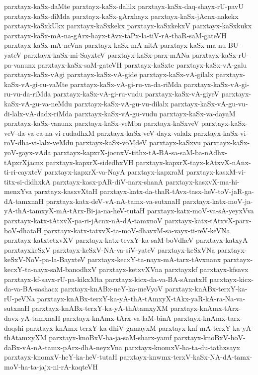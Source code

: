 {parxtayx-kaSx-daMte
parxtayx-kaSx-dalilx
parxtayx-kaSx-daq-shayx-rU-pavU
parxtayx-kaSx-diMda
parxtayx-kaSx-gArxhayx
parxtayx-kaSx-jAcnx-nakekx
parxtayx-kaSxkUkx
parxtayx-kaSxkekx
parxtayx-kaSxkekxV
parxtayx-kaSxkukx
parxtayx-kaSx-mA-na-gArx-hayx-tAvx-taPx-la-tiV-rA-thaR-saM-gateVH
parxtayx-kaSx-mA-neVna
parxtayx-kaSx-mA-nitA
parxtayx-kaSx-ma-nu-BU-yateV
parxtayx-kaSx-mi-SayxteV
parxtayx-kaSx-parx-mANa
parxtayx-kaSx-rU-pa-vanunx
parxtayx-kaSx-saM-gateVH
parxtayx-kaSxte
parxtayx-kaSx-vA-galu
parxtayx-kaSx-vAgi
parxtayx-kaSx-vA-gide
parxtayx-kaSx-vA-gilalx
parxtayx-kaSx-vA-gi-ru-vaMte
parxtayx-kaSx-vA-gi-ru-va-da-riMda
parxtayx-kaSx-vA-gi-ru-vu-da-riMda
parxtayx-kaSx-vA-gi-ru-vudu
parxtayx-kaSx-vA-giyeV
parxtayx-kaSx-vA-gu-va-neMdu
parxtayx-kaSx-vA-gu-vu-dilalx
parxtayx-kaSx-vA-gu-vu-di-lalx-vA-dadx-riMda
parxtayx-kaSx-vA-gu-vudu
parxtayx-kaSx-va-dayaM
parxtayx-kaSx-vanunx
parxtayx-kaSx-veMba
parxtayx-kaSxveV
parxtayx-kaSx-veV-da-va-ca-na-vi-rudadhxM
parxtayx-kaSx-veV-dayx-valalx
parxtayx-kaSx-vi-roV-dha-vi-lalx-veMdu
parxtayx-kaSx-voMdeV
parxtayx-kaSxvu
parxtayx-kaSx-yoV-gayx-vAda
parxtayx-kapxrX-jocnxV-tithx-tA-BA-sa-saM-ba-nAdhx-tApxrXjacnx
parxtayx-kapxrX-sidedhxVH
parxtayx-kapxrX-tayx-kAtxvX-nAnx-ti-ri-cayxteV
parxtayx-kapxrX-va-NayA
parxtayx-kapxraM
parxtayx-kasxM-vi-titx-si-didhxkA
parxtayx-kasx-pAR-diV-narx-shanA
parxtayx-kasxvX-ma-hi-menxYva
parxtayx-kasxvXtaH
parxtayx-katx-da-thaR-tAvx-tasx-heV-toV-jaR-ga-dA-tamxnaH
parxtayx-katx-deV-vA-nA-tamx-va-sutxnaH
parxtayx-katx-moV-ja-yA-thA-tamxyX-mA-tArx-Bi-ja-na-heV-tutaH
parxtayx-katx-moV-va-sA-yeyxVva
parxtayx-katx-tAtxvX-pa-ri-jAcnx-nA-dA-tamxnoV
parxtayx-katx-tAtxvX-parx-boV-dhataH
parxtayx-katx-tatxvX-ta-moV-dhavxM-sa-vayx-ti-reV-keVNa
parxtayx-katxtetxvXV
parxtayx-katx-tevxY-ka-saM-boVdheV
parxtayx-katxyA
parxtayxkeSxV
parxtayx-keSxV-NA-va-siV-yateV
parxtayx-keSxVNa
parxtayx-keSxV-NoV-pa-la-BayxteV
parxtayx-kecxY-ta-nayx-mA-tarx-tAvxnanx
parxtayx-kecxY-ta-nayx-saM-banodhxV
parxtayx-ketxvXVna
parxtayxkf
parxtayx-kfsavx
parxtayx-kf-savx-rU-pa-kikxMta
parxtayx-kicx-da-va-BA-sAnatxH
parxtayx-kicx-da-va-BA-sashacx
parxtayx-knABx-neY-ka-meVyoV
parxtayx-knABx-terxY-ka-rU-peVNa
parxtayx-knABx-terxY-ka-yA-thA-tAmxyX-tAkx-yaR-kA-ra-Na-va-sutxnaH
parxtayx-knABx-terxY-ka-yA-thAtamxyXM
parxtayx-knAmx-tArx-davx-yA-tamxnaH
parxtayx-knAmx-tArx-va-laM-binA
parxtayx-knAmx-tarx-daqshi
parxtayx-knAmx-terxY-ka-dhiV-gamayxM
parxtayx-knf-mA-terxY-ka-yA-thAtamxyXM
parxtayx-knoBxV-ha-ja-saM-sharx-yamf
parxtayx-knoBxV-hoV-daBx-vA-nA-tamx-pArx-dhA-neyxVna
parxtayx-knomxV-ha-ta-du-tathxsayx
parxtayx-knomxV-heY-ka-heV-tutaH
parxtayx-knwmx-terxV-kaSx-NA-dA-tamx-moV-ha-ta-jajx-ni-rA-kaqteVH
}
